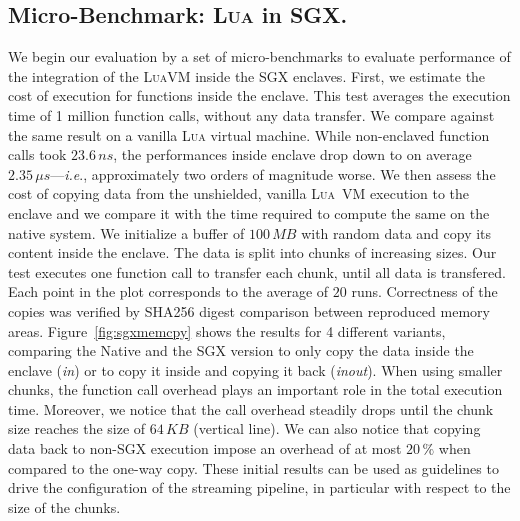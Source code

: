 \subsection{Micro-Benchmark: \textsc{Lua} in SGX.}
We begin our evaluation by a set of micro-benchmarks to evaluate performance of the integration of the \textsc{LuaVM} inside the SGX enclaves.
First, we estimate the cost of execution for functions inside the enclave.
This test averages the execution time of 1 million function calls, without any data transfer.
We compare against the same result on a vanilla \textsc{Lua} virtual machine.
While non-enclaved function calls took $23.6\,ns$, the performances inside enclave drop down to on average $2.35\,\mu{}s$---\textit{i.e}., approximately two orders of magnitude worse.
We then assess the cost of copying data from the unshielded, vanilla \textsc{Lua}~VM execution to the enclave and we compare it with the time required to compute the same on the native system.
We initialize a buffer of $100\,MB$ with random data and copy its content inside the enclave.
The data is split into chunks of increasing sizes.
Our test executes one function call to transfer each chunk, until all data is transfered.
Each point in the plot corresponds to the average of $20$ runs.
Correctness of the copies was verified by \textsf{SHA256} digest comparison between reproduced memory areas.
Figure~\ref{fig:sgxmemcpy} shows the results for 4 different variants, comparing the Native and the SGX version to only copy the data inside the enclave (\emph{in}) or to copy it inside and copying it back (\emph{in\/out}).
When using smaller chunks, the function call overhead plays an important role in the total execution time.
Moreover, we notice that the call overhead steadily drops until the chunk size reaches the size of $64\,KB$ (vertical line).
We can also notice that copying data back to non-SGX execution impose an overhead of at most $20\,\%$ when compared to the one-way copy.
These initial results can be used as guidelines to drive the configuration of the streaming pipeline, in particular with respect to the size of the chunks. %

